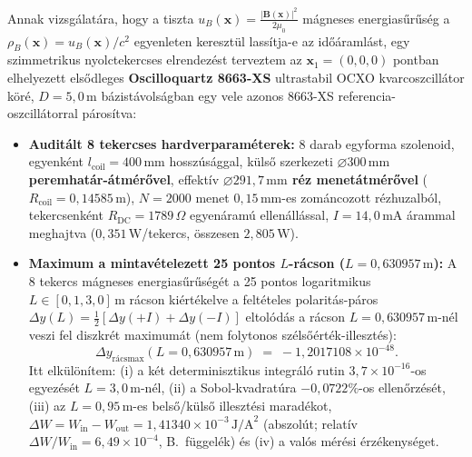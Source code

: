 \documentclass[10pt,a4paper]{article}
\begin{document}
\par
Annak vizsg\'alat\'ara, hogy a tiszta $u_B(\mathbf{x}) = \frac{|\mathbf{B}(\mathbf{x})|^2}{2\mu_0}$ m\'agneses energias\H{u}r\H{u}s\'eg a $\rho_B(\mathbf{x}) = u_B(\mathbf{x})/c^2$ egyenleten kereszt\"ul lass\'itja-e az id\H{o}\'araml\'ast, egy szimmetrikus nyolctekercses elrendez\'est terveztem az $\mathbf{x}_1 = (0,0,0)$ pontban elhelyezett els\H{o}dleges \textbf{Oscilloquartz 8663-XS} ultrastabil OCXO kvarcoszcill\'ator k\"or\'e, $D = 5{,}0\,\text{m}$ b\'azist\'avols\'agban egy vele azonos 8663-XS referencia-oszcill\'atorral p\'aros\'itva:
\begin{itemize}\setlength{\itemsep}{1pt}\setlength{\parskip}{0pt}\setlength{\topsep}{1pt}
  \item \textbf{Audit\'alt 8 tekercses hardverparam\'eterek:} 8 darab egyforma szolenoid, egyenk\'ent $l_{\text{coil}} = 400\,\text{mm}$ hossz\'us\'aggal, k\"uls\H{o} szerkezeti \textbf{$\varnothing 300\,\text{mm}$ peremhat\'ar-\'atm\'er\H{o}vel}, effekt\'iv \textbf{$\varnothing 291{,}7\,\text{mm}$ r\'ez menet\'atm\'er\H{o}vel} ($R_{\text{coil}} = 0{,}14585\,\text{m}$), $N = 2000$ menet $0{,}15\,\text{mm}$-es zom\'ancozott r\'ezhuzalb\'ol, tekercsenk\'ent $R_{\text{DC}} = 1789\,\Omega$ egyen\'aram\'u ellen\'all\'assal, $I = 14{,}0\,\text{mA}$ \'arammal meghajtva ($0{,}351\,\text{W}$/tekercs, \"osszesen $2{,}805\,\text{W}$).
  \item \textbf{Maximum a mintav\'etelezett 25 pontos $L$-r\'acson ($L = 0{,}630957\,\text{m}$):} A 8 tekercs m\'agneses energias\H{u}r\H{u}s\'eg\'et a 25 pontos logaritmikus $L \in [0{,}1, 3{,}0]\,\text{m}$ r\'acson ki\'ert\'ekelve a felt\'eteles polarit\'as-p\'aros $\Delta y(L) = \frac{1}{2}[\Delta y(+I) + \Delta y(-I)]$ eltol\'od\'as a r\'acson \textbf{$L = 0{,}630957\,\text{m}$}-n\'el veszi fel diszkr\'et maximum\'at (nem folytonos sz\'els\H{o}\'ert\'ek-illeszt\'es):
  \begin{equation}
    \Delta y_{\text{r\'acsmax}}(L = 0{,}630957\,\text{m}) \;=\; -1{,}2017108\times 10^{-48}.
  \end{equation}
  Itt elk\"ul\"on\'item: (i) a k\'et determinisztikus integr\'al\'o rutin $3{,}7\times 10^{-16}$-os egyez\'es\'et $L=3{,}0\,\text{m}$-n\'el, (ii) a Sobol-kvadrat\'ura $-0{,}0722\%$-os ellen\H{o}rz\'es\'et, (iii) az $L=0{,}95\,\text{m}$-es bels\H{o}/k\"uls\H{o} illeszt\'esi marad\'ekot, $\Delta W = W_{\text{in}} - W_{\text{out}} = 1{,}41340\times 10^{-3}\,\text{J/A}^2$ (abszol\'ut; relat\'iv $\Delta W/W_{\text{in}} = 6{,}49\times 10^{-4}$, B.\ f\"uggel\'ek) \'es (iv) a val\'os m\'er\'esi \'erz\'ekenys\'eget.

\end{itemize}
\end{document}
